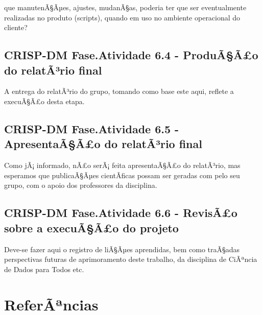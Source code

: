 \documentclass[]{article}
\begin{document}
que manutenÃ§Ãµes, ajustes, mudanÃ§as, poderia ter que ser eventualmente
realizadas no produto (scripts), quando em uso no ambiente operacional
do cliente?

\subsection{CRISP-DM Fase.Atividade 6.4 - ProduÃ§Ã£o do relatÃ³rio
final}\label{crisp-dm-fase.atividade-6.4---produaao-do-relatario-final}

A entrega do relatÃ³rio do grupo, tomando como base este aqui, reflete a
execuÃ§Ã£o desta etapa.

\subsection{CRISP-DM Fase.Atividade 6.5 - ApresentaÃ§Ã£o do relatÃ³rio
final}\label{crisp-dm-fase.atividade-6.5---apresentaaao-do-relatario-final}

Como jÃ¡ informado, nÃ£o serÃ¡ feita apresentaÃ§Ã£o do relatÃ³rio, mas
esperamos que publicaÃ§Ãµes cientÃ­ficas possam ser geradas com pelo seu
grupo, com o apoio dos professores da disciplina.

\subsection{CRISP-DM Fase.Atividade 6.6 - RevisÃ£o sobre a execuÃ§Ã£o do
projeto}\label{crisp-dm-fase.atividade-6.6---revisao-sobre-a-execuaao-do-projeto}

Deve-se fazer aqui o registro de liÃ§Ãµes aprendidas, bem como traÃ§adas
perspectivas futuras de aprimoramento deste trabalho, da disciplina de
CiÃªncia de Dados para Todos etc.

\section{ReferÃªncias}\label{referancias}
\end{document}
